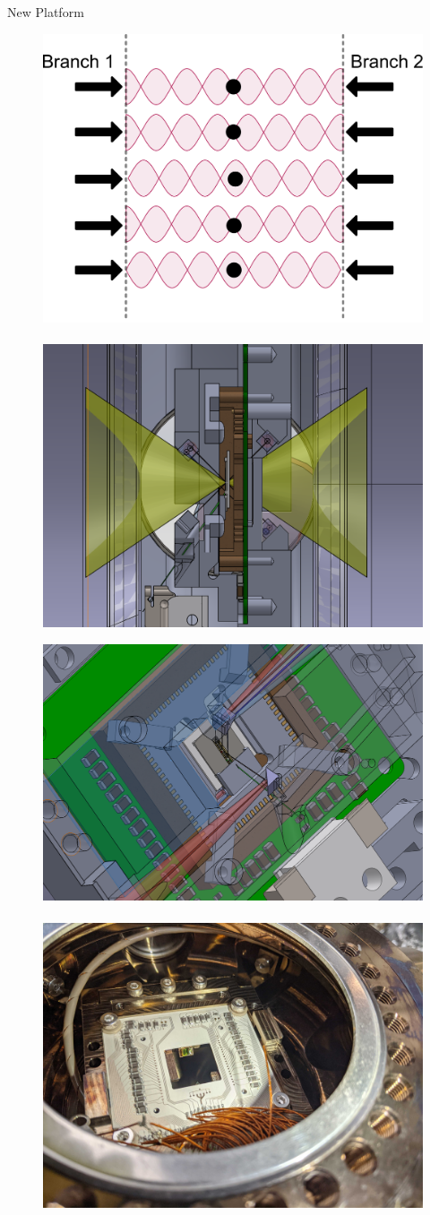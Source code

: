 \documentclass[final]{beamer}
\begin{document}
\begin{frame}{}
\begin{center}
\begin{columns}[t]
\begin{column}{0.49\textwidth}
\begin{alertblock}{New Platform}
      \begin{figure}
        \includegraphics[height=0.354\textwidth]{./figs/single_address.pdf}~~~
        \includegraphics[height=0.354\textwidth]{./figs/trap_NA.png}\vspace{1em}

        \includegraphics[height=0.336\textwidth]{./figs/solidworks_overview.png}~~~
        \includegraphics[height=0.336\textwidth]{./figs/mirror_photo.jpg}
      \end{figure}

    \end{alertblock}

  \end{column}
\end{columns}

\end{center}
\end{frame}
\end{document}
